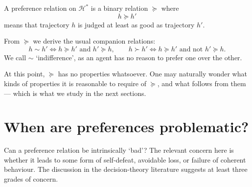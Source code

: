 \documentclass[11pt]{article}
\newcommand{\Hcal}{\mathcal{H}}
\newcommand{\pref}{\succcurlyeq}
\newcommand{\strictpref}{\succ}
\newcommand{\indiff}{\sim}
\begin{document}
\begin{definition}[Preference]
A preference relation on $\Hcal^*$ is a binary relation $\pref$ where
\[
h \pref h'
\]
means that trajectory $h$ is judged at least as good as trajectory $h'$.
\end{definition}

From $\pref$ we derive the usual companion relations:
\[
h \indiff h' \iff h \pref h' \text{ and } h' \pref h,
\qquad
h \strictpref h' \iff h \pref h' \text{ and not } h' \pref h.
\]
We call $\indiff$ `indifference', as an agent has no reason to prefer one over
the other.

At this point, $\pref$ has no properties whatsoever.
One may naturally wonder what kinds of properties it is reasonable to require
of $\pref$, and what follows from them --- which is what we study in the next
sections.


\section{When are preferences problematic?}

Can a preference relation be intrinsically `bad'? The relevant concern here is
whether it leads to some form of self-defeat, avoidable loss, or failure of
coherent behaviour. The discussion in the decision-theory literature suggests at
least three grades of concern.
\end{document}
